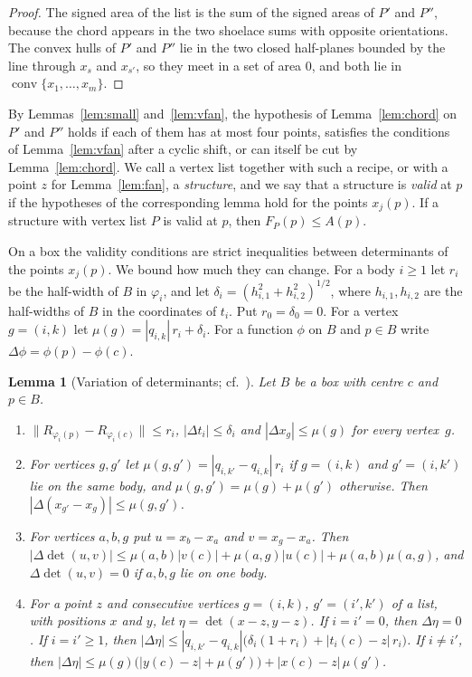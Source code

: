 \documentclass[11pt]{amsart}
\newtheorem{lemma}[theorem]{Lemma}
\theoremstyle{definition}
\theoremstyle{remark}
\numberwithin{equation}{section}
\newcommand{\conv}{\operatorname{conv}}
\begin{document}
\begin{proof}
The signed area of the list is the sum of the signed areas of $P'$ and $P''$, because the chord appears in the two shoelace sums with opposite orientations. The convex hulls of $P'$ and $P''$ lie in the two closed half-planes bounded by the line through $x_s$ and $x_{s'}$, so they meet in a set of area $0$, and both lie in $\conv\{x_1,\dots,x_m\}$.
\end{proof}

By Lemmas~\ref{lem:small} and~\ref{lem:vfan}, the hypothesis of Lemma~\ref{lem:chord} on $P'$ and $P''$ holds if each of them has at most four points, satisfies the conditions of Lemma~\ref{lem:vfan} after a cyclic shift, or can itself be cut by Lemma~\ref{lem:chord}. We call a vertex list together with such a recipe, or with a point $z$ for Lemma~\ref{lem:fan}, a \emph{structure}, and we say that a structure is \emph{valid} at $p$ if the hypotheses of the corresponding lemma hold for the points $x_j(p)$. If a structure with vertex list $P$ is valid at $p$, then $F_P(p)\le A(p)$.

On a box the validity conditions are strict inequalities between determinants of the points $x_j(p)$. We bound how much they can change. For a body $i\ge1$ let $r_i$ be the half-width of $B$ in $\varphi_i$, and let $\delta_i=(h_{i,1}^2+h_{i,2}^2)^{1/2}$, where $h_{i,1},h_{i,2}$ are the half-widths of $B$ in the coordinates of $t_i$. Put $r_0=\delta_0=0$. For a vertex $g=(i,k)$ let $\mu(g)=|q_{i,k}|\,r_i+\delta_i$. For a function $\phi$ on $B$ and $p\in B$ write $\Delta\phi=\phi(p)-\phi(c)$.

\begin{lemma}[Variation of determinants; cf.\ {\cite[Lemma~3.6]{Tom26}}]\label{lem:detvar}
Let $B$ be a box with centre $c$ and $p\in B$.
\begin{enumerate}[label=\textup{(\alph*)},leftmargin=*]
\item $\|R_{\varphi_i(p)}-R_{\varphi_i(c)}\|\le r_i$, $|\Delta t_i|\le\delta_i$ and $|\Delta x_g|\le\mu(g)$ for every vertex~$g$.
\item For vertices $g,g'$ let $\mu(g,g')=|q_{i,k'}-q_{i,k}|\,r_i$ if $g=(i,k)$ and $g'=(i,k')$ lie on the same body, and $\mu(g,g')=\mu(g)+\mu(g')$ otherwise. Then $|\Delta(x_{g'}-x_g)|\le\mu(g,g')$.
\item For vertices $a,b,g$ put $u=x_b-x_a$ and $v=x_g-x_a$. Then $|\Delta\det(u,v)|\le\mu(a,b)|v(c)|+\mu(a,g)|u(c)|+\mu(a,b)\mu(a,g)$, and $\Delta\det(u,v)=0$ if $a,b,g$ lie on one body.
\item For a point $z$ and consecutive vertices $g=(i,k)$, $g'=(i',k')$ of a list, with positions $x$ and $y$, let $\eta=\det(x-z,y-z)$. If $i=i'=0$, then $\Delta\eta=0$. If $i=i'\ge1$, then $|\Delta\eta|\le|q_{i,k'}-q_{i,k}|\bigl(\delta_i(1+r_i)+|t_i(c)-z|\,r_i\bigr)$. If $i\ne i'$, then $|\Delta\eta|\le\mu(g)\bigl(|y(c)-z|+\mu(g')\bigr)+|x(c)-z|\,\mu(g')$.
\end{enumerate}
\end{lemma}
\end{document}
